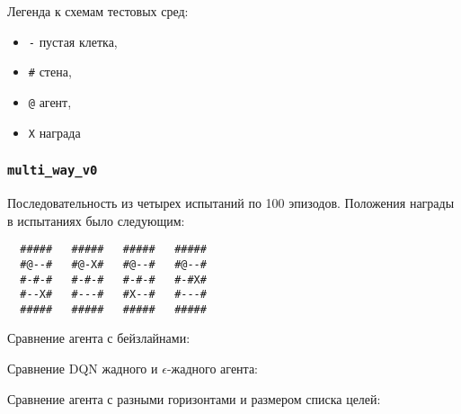 \documentclass[a4paper]{article}
\begin{document}
Легенда к схемам тестовых сред:

\begin{itemize}
    \item \verb|-| пустая клетка,
    \item \verb|#| стена,
    \item \verb|@| агент,
    \item \verb|X| награда
\end{itemize}

\subsubsection {\texttt{multi\_way\_v0}}

Последовательность из четырех испытаний по 100 эпизодов. Положения награды в испытаниях было следующим:


\begin{verbatim}
  #####   #####   #####   #####
  #@--#   #@-X#   #@--#   #@--#
  #-#-#   #-#-#   #-#-#   #-#X#
  #--X#   #---#   #X--#   #---#
  #####   #####   #####   #####
\end{verbatim}

Сравнение агента с бейзлайнами:


Сравнение DQN жадного и $\epsilon$-жадного агента:


Сравнение агента с разными горизонтами и размером списка целей:

  

  

  
\end{document}
